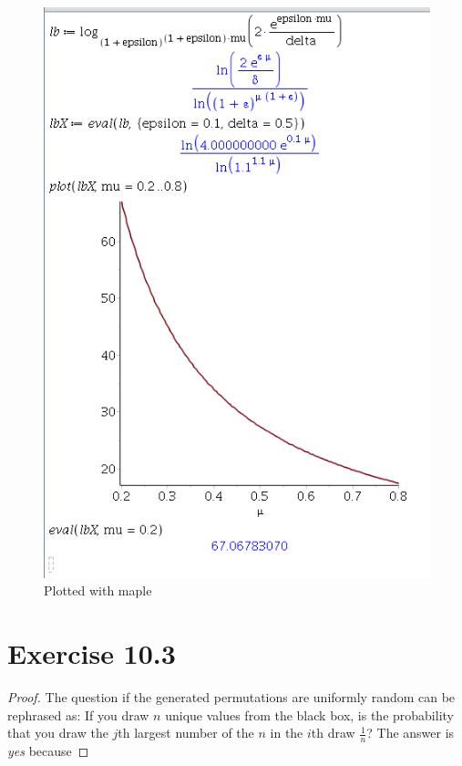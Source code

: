 \documentclass[10pt,a4paper]{article}
\begin{document}
\begin{figure}
  \centering
  \includegraphics[width=\textwidth]{sheet-10/exercise-10-2}
  \caption{Plotted with maple}
  \label{fig:exercise-10-2-plot}
\end{figure}

\section*{Exercise 10.3}

\begin{proof}
  The question if the generated permutations are uniformly random can be rephrased as: If you draw $n$ unique values from the black box, is the probability that you draw the $j$th largest number of the $n$ in the $i$th draw $\frac{1}{n}$?
  The answer is \emph{yes} because
\end{proof}
\end{document}
